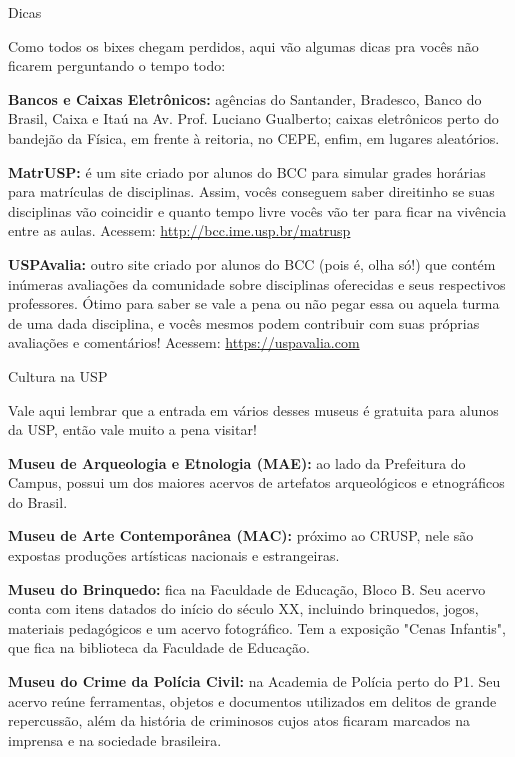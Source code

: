 \begin{secao}{Dicas}

Como todos os bixes chegam perdidos, aqui vão algumas dicas pra vocês não ficarem perguntando o tempo todo:

{\bf Bancos e Caixas Eletrônicos:} agências do Santander, Bradesco,
Banco do Brasil, Caixa e Itaú na Av. Prof. Luciano
Gualberto; caixas eletrônicos perto do bandejão da Física, em frente à reitoria,
no CEPE, enfim, em lugares aleatórios.

{\bf MatrUSP:} é um site criado por alunos do BCC para simular grades horárias
para matrículas de disciplinas. Assim, vocês conseguem saber direitinho se suas
disciplinas vão coincidir e quanto tempo livre vocês vão ter para ficar na
vivência entre as aulas. Acessem: \url{http://bcc.ime.usp.br/matrusp}

{\bf USPAvalia:} outro site criado por alunos do BCC (pois é, olha só!) que
contém inúmeras avaliações da comunidade sobre disciplinas oferecidas e
seus respectivos professores. Ótimo para saber se vale a pena ou não pegar
essa ou aquela turma de uma dada disciplina, e vocês mesmos podem contribuir com
suas próprias avaliações e comentários! Acessem: \url{https://uspavalia.com}

\begin{subsecao}{Cultura na USP}

Vale aqui lembrar que a entrada em vários desses museus é gratuita para alunos da
USP, então vale muito a pena visitar!

{\bf Museu de Arqueologia e Etnologia (MAE):} ao lado da Prefeitura do Campus,
possui um dos maiores acervos de artefatos arqueológicos e etnográficos do Brasil.

{\bf Museu de Arte Contemporânea (MAC):} próximo ao CRUSP, nele são expostas produções
artísticas nacionais e estrangeiras.

{\bf Museu do Brinquedo:} fica na Faculdade de Educação, Bloco B. Seu acervo conta 
com itens datados do início do século XX, incluindo brinquedos, jogos, materiais
pedagógicos e um acervo fotográfico. Tem a exposição "Cenas Infantis", que fica na
biblioteca da Faculdade de Educação.

{\bf Museu do Crime da Polícia Civil:} na Academia de Polícia perto do P1. Seu acervo
reúne ferramentas, objetos e documentos utilizados em delitos de grande repercussão, 
além da história de criminosos cujos atos ficaram marcados na imprensa e na sociedade
brasileira.


\end{subsecao}
\end{secao}
